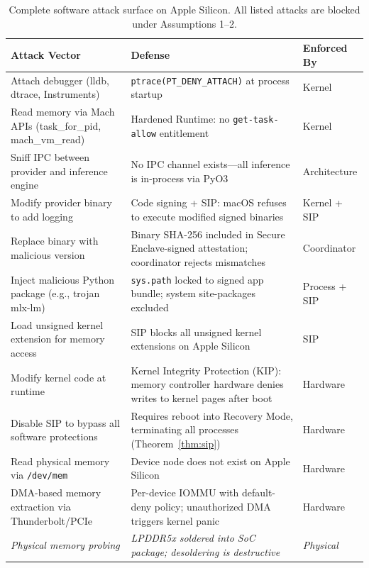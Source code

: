 \documentclass[10pt,twocolumn,letterpaper]{article}
\begin{document}
\begin{table}[t]
\centering
\caption{Complete software attack surface on Apple Silicon. All listed attacks are blocked under Assumptions 1--2.}
\label{tab:attacks}
\vspace{4pt}
\small
\begin{tabularx}{\textwidth}{@{}lXl@{}}
\toprule
\textbf{Attack Vector} & \textbf{Defense} & \textbf{Enforced By} \\
\midrule
Attach debugger (lldb, dtrace, Instruments) & \texttt{ptrace(PT\_DENY\_ATTACH)} at process startup & Kernel \\
Read memory via Mach APIs (task\_for\_pid, mach\_vm\_read) & Hardened Runtime: no \texttt{get-task-allow} entitlement & Kernel \\
Sniff IPC between provider and inference engine & No IPC channel exists---all inference is in-process via PyO3 & Architecture \\
Modify provider binary to add logging & Code signing + SIP: macOS refuses to execute modified signed binaries & Kernel + SIP \\
Replace binary with malicious version & Binary SHA-256 included in Secure Enclave-signed attestation; coordinator rejects mismatches & Coordinator \\
Inject malicious Python package (e.g., trojan mlx-lm) & \texttt{sys.path} locked to signed app bundle; system site-packages excluded & Process + SIP \\
Load unsigned kernel extension for memory access & SIP blocks all unsigned kernel extensions on Apple Silicon & SIP \\
Modify kernel code at runtime & Kernel Integrity Protection (KIP): memory controller hardware denies writes to kernel pages after boot & Hardware \\
Disable SIP to bypass all software protections & Requires reboot into Recovery Mode, terminating all processes (Theorem~\ref{thm:sip}) & Hardware \\
Read physical memory via \texttt{/dev/mem} & Device node does not exist on Apple Silicon & Hardware \\
DMA-based memory extraction via Thunderbolt/PCIe & Per-device IOMMU with default-deny policy; unauthorized DMA triggers kernel panic & Hardware \\
\midrule
\textit{Physical memory probing} & \textit{LPDDR5x soldered into SoC package; desoldering is destructive} & \textit{Physical} \\
\bottomrule
\end{tabularx}
\end{table}
\end{document}
